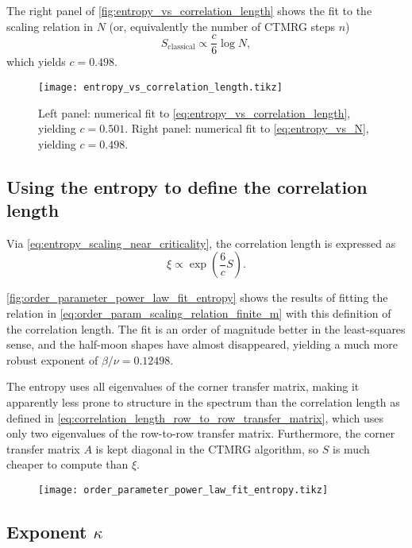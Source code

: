 The right panel of \autoref{fig:entropy_vs_correlation_length} shows the fit to the scaling relation in $N$ (or,
equivalently the number of CTMRG steps $n$)
\begin{equation}\label{eq:entropy_vs_N}
  S_{\text{classical}} \propto \frac{c}{6} \log N,
\end{equation}
which yields $c = 0.498$.

\begin{figure}
  \texttt{[image: entropy\_vs\_correlation\_length.tikz]}
  \caption{Left panel: numerical fit to \autoref{eq:entropy_vs_correlation_length}, yielding $c = 0.501$. Right panel:
  numerical fit to \autoref{eq:entropy_vs_N}, yielding $c = 0.498$. }\label{fig:entropy_vs_correlation_length}
\end{figure}

\subsection{Using the entropy to define the correlation length}
Via \autoref{eq:entropy_scaling_near_criticality}, the correlation length is expressed as
\begin{equation}
  \xi \propto \exp(\frac{6}{c}S).
\end{equation}

\autoref{fig:order_parameter_power_law_fit_entropy} shows the results of fitting the relation in
\autoref{eq:order_param_scaling_relation_finite_m} with this definition of the correlation length. The fit is an order
of magnitude better in the least-squares sense, and the half-moon shapes have almost disappeared,
yielding a much more robust exponent of $\beta/\nu = 0.12498$.

The entropy uses all eigenvalues of the corner transfer matrix, making it apparently less prone to structure in the
spectrum than the correlation length as defined in \autoref{eq:correlation_length_row_to_row_transfer_matrix},
which uses only two eigenvalues of the row-to-row transfer matrix.
Furthermore, the corner transfer matrix $A$ is kept diagonal in the CTMRG algorithm,
so $S$ is much cheaper to compute than $\xi$.

\begin{figure}
  \texttt{[image: order\_parameter\_power\_law\_fit\_entropy.tikz]}
  \caption{}\label{fig:order_parameter_power_law_fit_entropy}
\end{figure}

\subsection{Exponent $\kappa$}

